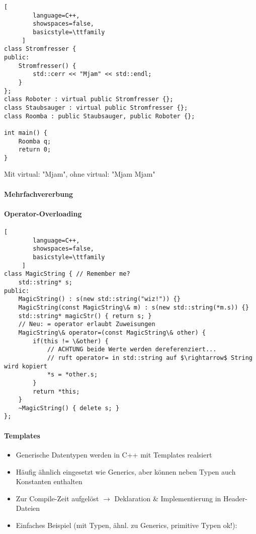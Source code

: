 \documentclass[10pt]{article}
\begin{document}
\begin{lstlisting}[
        language=C++,
        showspaces=false,
        basicstyle=\ttfamily
     ]
class Stromfresser {
public:
    Stromfresser() {
        std::cerr << "Mjam" << std::endl;
    }
};
class Roboter : virtual public Stromfresser {};
class Staubsauger : virtual public Stromfresser {};
class Roomba : public Staubsauger, public Roboter {};

int main() {
    Roomba q;
    return 0;
}
\end{lstlisting}
Mit virtual: "Mjam", ohne virtual: "Mjam Mjam"


\paragraph{Mehrfachvererbung}


\paragraph{Operator-Overloading}
\begin{lstlisting}[
        language=C++,
        showspaces=false,
        basicstyle=\ttfamily
     ]
class MagicString { // Remember me?
    std::string* s;
public:
    MagicString() : s(new std::string("wiz!")) {}
    MagicString(const MagicString\& m) : s(new std::string(*m.s)) {}
    std::string* magicStr() { return s; }
    // Neu: = operator erlaubt Zuweisungen
    MagicString\& operator=(const MagicString\& other) {
        if(this != \&other) {
            // ACHTUNG beide Werte werden dereferenziert...
            // ruft operator= in std::string auf $\rightarrow$ String wird kopiert
            *s = *other.s;
        }
        return *this;
    }
    ~MagicString() { delete s; }
};
\end{lstlisting}


\paragraph{Templates}
\begin{itemize}
  \item Generische Datentypen werden in C++ mit Templates realsiert
  \item Häufig ähnlich eingesetzt wie Generics, aber können neben Typen auch Konstanten enthalten
  \item Zur Compile-Zeit aufgelöst $\rightarrow$ Deklaration \& Implementierung in Header-Dateien
  \item Einfaches Beispiel (mit Typen, ähnl. zu Generics, primitive Typen ok!):
\end{itemize}
\end{document}
